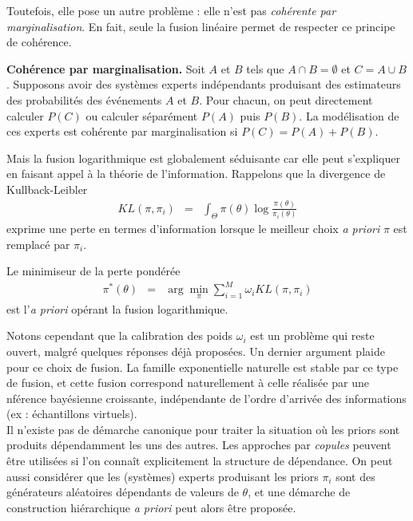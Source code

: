 Toutefois, elle pose un autre problème : elle n'est pas \emph{cohérente par marginalisation}. En fait, seule la fusion linéaire permet de respecter ce principe de cohérence. 

\begin{definition}{\bf Cohérence par marginalisation.}
Soit $A$ et $B$ tels que $A\cap B=\emptyset$ et $C=A\cup B$. Supposons avoir des systèmes experts indépendants produisant des estimateurs des probabilités des événements $A$ et $B$. Pour chacun, on peut directement calculer $P(C)$ ou calculer séparément $P(A)$ puis $P(B)$. La modélisation de ces experts est cohérente par marginalisation si  $P(C)=P(A)+P(B)$. 
\end{definition}

Mais la fusion logarithmique est globalement séduisante car elle peut s'expliquer en faisant appel à la théorie de l'information. Rappelons que la  divergence de Kullback-Leibler 
\begin{eqnarray*}
KL(\pi,\pi_i) & = & \int_{\Theta} \pi(\theta) \log \frac{\pi(\theta)}{\pi_i(\theta)}
\end{eqnarray*}
exprime une {perte en termes d'information} lorsque le meilleur choix {\it a priori} $\pi$ est remplacé par $\pi_i$. 

\begin{proposition}
Le minimiseur de la perte pondérée
\begin{eqnarray*}
\pi^*(\theta) & = & \arg\min\limits_{\pi} \sum\limits_{i=1}^M  \omega_i KL(\pi,\pi_i)
\end{eqnarray*}
est l'{\it a priori} opérant la fusion logarithmique. 
\end{proposition}


\if{} \vspace{1cm} 
\fi
\vspace{0.5cm}

Notons cependant que la calibration des poids $\omega_i$ est un problème qui reste ouvert, malgré quelques réponses déjà proposées. Un dernier argument plaide pour ce choix de fusion. La famille exponentielle naturelle est stable par ce type de fusion, et cette fusion correspond naturellement à celle réalisée par une nférence bayésienne croissante, indépendante de l'ordre d'arrivée des informations (ex : échantillons virtuels).  \\

\noindent Il n'existe pas de démarche canonique pour traiter la situation où les priors sont produits dépendamment les uns des autres. Les approches par \emph{copules} peuvent être utilisées si l'on connaît explicitement la structure de dépendance. On peut aussi considérer que les (systèmes) experts produisant les priors $\pi_i$ sont des générateurs aléatoires dépendants de valeurs de $\theta$, et une démarche de construction hiérarchique {\it a priori} peut alors être proposée. 

